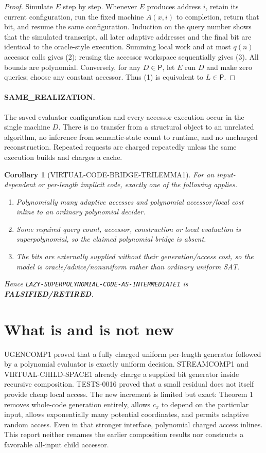 \documentclass[11pt]{article}
\newtheorem{corollary}[theorem]{Corollary}
\newcommand{\Pclass}{\mathsf{P}}
\newcommand{\RET}{\textbf{FALSIFIED/RETIRED}}
\begin{document}
\begin{proof}
Simulate $E$ step by step.  Whenever $E$ produces address $i$, retain its
current configuration, run the fixed machine $A(x,i)$ to completion, return
that bit, and resume the same configuration.  Induction on the query number
shows that the simulated transcript, all later adaptive addresses and the
final bit are identical to the oracle-style execution.  Summing local work
and at most $q(n)$ accessor calls gives (2); reusing the accessor workspace
sequentially gives (3).  All bounds are polynomial.  Conversely, for any
$D\in\Pclass$, let $E$ run $D$ and make zero queries; choose any constant
accessor.  Thus (1) is equivalent to $L\in\Pclass$.
\end{proof}

\paragraph{SAME\_REALIZATION.}
The saved evaluator configuration and every accessor execution occur in the
single machine $D$.  There is no transfer from a structural object to an
unrelated algorithm, no inference from semantic-state count to runtime, and
no uncharged reconstruction.  Repeated requests are charged repeatedly
unless the same execution builds and charges a cache.

\begin{corollary}[VIRTUAL-CODE-BRIDGE-TRILEMMA1]
For an input-dependent or per-length implicit code, exactly one of the
following applies.
\begin{enumerate}
\item Polynomially many adaptive accesses and polynomial accessor/local cost
inline to an ordinary polynomial decider.
\item Some required query count, accessor, construction or local evaluation
is superpolynomial, so the claimed polynomial bridge is absent.
\item The bits are externally supplied without their generation/access cost,
so the model is oracle/advice/nonuniform rather than ordinary uniform SAT.
\end{enumerate}
Hence \texttt{LAZY-SUPERPOLYNOMIAL-CODE-AS-INTERMEDIATE1} is \RET.
\end{corollary}

\section{What is and is not new}
UGENCOMP1 proved that a fully charged uniform per-length generator followed
by a polynomial evaluator is exactly uniform decision.  STREAMCOMP1 and
VIRTUAL-CHILD-SPACE1 already charge a supplied bit generator inside recursive
composition.  TESTS-0016 proved that a small residual does not itself provide
cheap local access.  The new increment is limited but exact: Theorem 1 removes
whole-code generation entirely, allows $c_x$ to depend on the particular
input, allows exponentially many potential coordinates, and permits adaptive
random access.  Even in that stronger interface, polynomial charged access
inlines.  This report neither renames the earlier composition results nor
constructs a favorable all-input child accessor.
\end{document}
